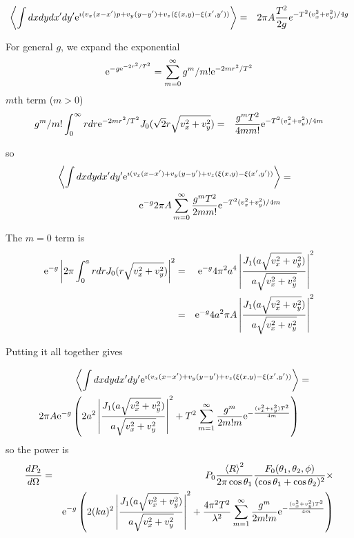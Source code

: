 \documentclass[11pt,openany]{report}
\newcommand{\der}[2]{\frac{d {#1}}{d {#2}}}
\newcommand{\e}{{\rm e}}
\begin{document}
{{ \begin{eqnarray}
\left<\int dx dydx'dy'\e^{\imath( v_{x}(x-x')p+v_{y}(y-y')+v_{z}(\xi(x,y)-\xi(x',y'))}\right>&=&
2\pi A\frac{T^{2}}{2g}e^{-T^{2}(v_{x}^{2}+v_{y}^{2})/4g}\end{eqnarray}

For general $g$, we expand the exponential
$$\e^{-g\e^{-2r^{2}/T^{2}}}=\sum_{m=0}^{\infty}g^{m}/m!\e^{-2mr^{2}/T^{2}}$$
$m$th term ($m > 0$)
\begin{eqnarray}
g^{m}/m!\int_{0}^{\infty} r dr\e^{-2mr^{2}/T^{2}} J_{0}(\sqrt{2}r\sqrt{v_{x}^{2}+v_{y}^{2}})&=&
\frac{g^{m}T^{2}}{4mm!}\e^{-T^{2}(v_{x}^{2}+v_{y}^{2})/4m}
\end{eqnarray}

so
 \begin{eqnarray}
\left<\int dx dydx'dy'\e^{\imath( v_{x}(x-x')+v_{y}(y-y')+v_{z}(\xi(x,y)-\xi(x',y'))}\right>&=&\\
\e^{-g}2\pi A\sum_{m=0}^{\infty}\frac{g^{m}T^{2}}{2mm!}\e^{-T^{2}(v_{x}^{2}+v_{y}^{2})/4m}\end{eqnarray}


The $m=0$  term is
\begin{eqnarray}
\e^{-g} \left|2\pi\int_{0}^{a}r dr J_{0}(r\sqrt{v_{x}^{2}+v_{y}^{2}})\right|^{2}&=&\e^{-g}4\pi^{2}a^{4}\left|\frac{J_{1}(a\sqrt{v_{x}^{2}+v_{y}^{2}})}{a\sqrt{v_{x}^{2}+v_{y}^{2}}}\right|^{2}\\
&=&\e^{-g}4a^{2}\pi A\left|\frac{J_{1}(a\sqrt{v_{x}^{2}+v_{y}^{2}})}{a\sqrt{v_{x}^{2}+v_{y}^{2}}}\right|^{2}\end{eqnarray}

Putting it all together gives

\begin{eqnarray}
\left<\int dx dydx'dy'\e^{\imath( v_{x}(x-x')+v_{y}(y-y')+v_{z}(\xi(x,y)-\xi(x',y'))}\right>&=&\\
2\pi A\e^{-g}\left(2a^{2}\left|\frac{J_{1}(a\sqrt{v_{x}^{2}+v_{y}^{2}})}{a\sqrt{v_{x}^{2}+v_{y}^{2}}}\right|^{2}+T^{2}\sum_{m=1}^{\infty}\frac{g^{m}}{2m!m}\e^{-\frac{(v_{x}^{2}+v_{y}^{2})T^{2}}{4m}}\right)\end{eqnarray}
so the power is
\begin{eqnarray}
\der{P_{2}}{\Omega}&=&P_{0}\frac{\left<R\right>^{2}}{2\pi\cos\theta_{1}}\frac{F_{0}(\theta_{1},\theta_{2},\phi)}{(\cos{\theta_{1}}+\cos{\theta_{2}})^{2}}\times\\
&&\e^{-g}\left(2(ka)^{2}\left|\frac{J_{1}(a\sqrt{v_{x}^{2}+v_{y}^{2}})}{a\sqrt{v_{x}^{2}+v_{y}^{2}}}\right|^{2}+\frac{4\pi^{2}T^{2}}{\lambda^{2}}\sum_{m=1}^{\infty}\frac{g^{m}}{2m!m}\e^{-\frac{(v_{x}^{2}+v_{y}^{2})T^{2}}{4m}}\right)\end{eqnarray}

}}
\end{document}
